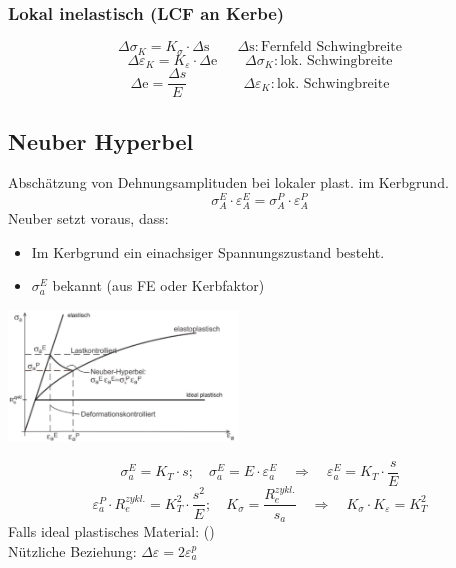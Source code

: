        \subsubsection{Lokal inelastisch (LCF an Kerbe)}
            \[\Delta\sigma_K = K_{\sigma} \cdot \Delta\textrm{s} \qquad \Delta\textrm{s}:\textrm{Fernfeld Schwingbreite}\]
            \[\Delta\varepsilon_K = K_{\varepsilon} \cdot \Delta\textrm{e} \qquad \Delta\sigma_K:\textrm{lok. Schwingbreite}\]
            \[\Delta\textrm{e}=\frac{\Delta s}{E} \qquad\qquad \Delta\varepsilon_K:\textrm{lok. Schwingbreite}\]
    \subsection{Neuber Hyperbel}
        Abschätzung von Dehnungsamplituden bei lokaler plast. im Kerbgrund.
        \[\boxed{\sigma_A^E\cdot\varepsilon_A^E = \sigma_A^P \cdot \varepsilon_A^P}\]
        Neuber setzt voraus, dass:
        \begin{itemize}
            \item Im Kerbgrund ein einachsiger Spannungszustand besteht.
            \item $\sigma_a^E$ bekannt (aus FE oder Kerbfaktor)
        \end{itemize}
        \begin{center}
            \includegraphics[width=0.8\linewidth, height=35mm]{images/06/Neuber_Hyperbel.jpeg}
        \end{center}
        \[\sigma_a^E = K_T \cdot s; \quad \sigma_a^E = E \cdot \varepsilon_a^E \quad\Rightarrow\quad \varepsilon_a^E = K_T \cdot \frac{s}{E}\]
        \vspace{-4mm}\[\varepsilon_a^P \cdot R_{e}^{zykl.} = K_T^2 \cdot \frac{s^2}{E}; \quad K_{\sigma}=\frac{R_{e}^{zykl.}}{s_a} \quad\Rightarrow\quad K_{\sigma} \cdot K_{\varepsilon} = K_T^2\]
        Falls ideal plastisches Material: ()
        \\Nützliche Beziehung: $\Delta\varepsilon = 2\varepsilon_{a}^{p}$

\vfill\null\columnbreak
